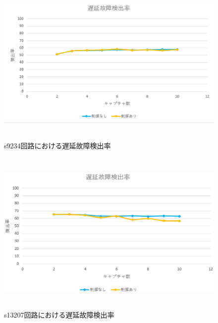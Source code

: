 \begin{figure}[h]
\begin{center}
	\includegraphics[height=80mm]{s9234CPI.eps}
	\caption{s9234回路における遅延故障検出率}
\end{center}
\end{figure}

\begin{figure}[h]
\begin{center}
	\includegraphics[height=80mm]{s13207CPI.eps}
	\caption{s13207回路における遅延故障検出率}
\end{center}
\end{figure}